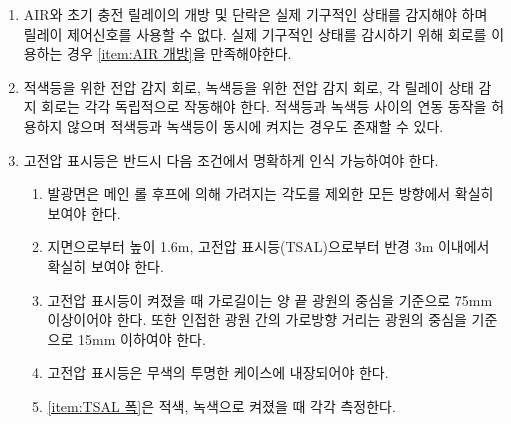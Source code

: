 \documentclass[final,a4paper,10pt]{report}
\begin{document}
\begin{enumerate}
  \item\label{rule:formula-technical.tractive-system-active-light.mechanical-state-detection} AIR와 초기 충전 릴레이의 개방 및 단락은 실제 기구적인 상태를 감지해야 하며 릴레이 제어신호를 사용할 수 없다. 실제 기구적인 상태를 감시하기 위해 회로를 이용하는 경우 \ref{item:AIR 개방}을 만족해야한다.
  \item\label{rule:formula-technical.tractive-system-active-light.independent-detection-circuits} 적색등을 위한 전압 감지 회로, 녹색등을 위한 전압 감지 회로, 각 릴레이 상태 감지 회로는 각각 독립적으로 작동해야 한다. 적색등과 녹색등 사이의 연동 동작을 허용하지 않으며 적색등과 녹색등이 동시에 켜지는 경우도 존재할 수 있다.

  \item\label{rule:formula-technical.tractive-system-active-light.visibility-conditions} 고전압 표시등은 반드시 다음 조건에서 명확하게 인식 가능하여야 한다.
    \begin{enumerate}
      \item\label{rule:formula-technical.tractive-system-active-light.visibility-conditions.all-directions-except-hoop} 발광면은 메인 롤 후프에 의해 가려지는 각도를 제외한 모든 방향에서 확실히 보여야 한다.
      \item\label{rule:formula-technical.tractive-system-active-light.visibility-conditions.viewing-height-and-radius} 지면으로부터 높이 1.6m, 고전압 표시등(TSAL)으로부터 반경 3m 이내에서 확실히 보여야 한다.
      \item\label{rule:formula-technical.tractive-system-active-light.visibility-conditions.led-width-and-spacing} 고전압 표시등이 켜졌을 때 가로길이는 양 끝 광원의 중심을 기준으로 75mm 이상이어야 한다. 또한 인접한 광원 간의 가로방향 거리는 광원의 중심을 기준으로 15mm 이하여야 한다. \label{item:TSAL 폭}
      \item\label{rule:formula-technical.tractive-system-active-light.visibility-conditions.clear-case} 고전압 표시등은 무색의 투명한 케이스에 내장되어야 한다.
      \item\label{rule:formula-technical.tractive-system-active-light.visibility-conditions.measured-separately-per-color} \ref{item:TSAL 폭}은 적색, 녹색으로 켜졌을 때 각각 측정한다.
    \end{enumerate}


\end{enumerate}
\end{document}
